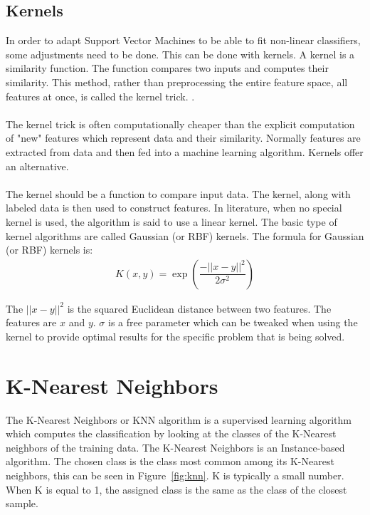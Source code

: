 \subsection{Kernels}
 In order to adapt Support Vector Machines to be able to fit non-linear classifiers, some adjustments need to be done. This can be done with kernels. A kernel is a similarity function. The function compares two inputs and computes their similarity. This method, rather than preprocessing the entire feature space, all features at once, is called the kernel trick. \cite{kernelTrick}. \\
\\
The kernel trick is often computationally cheaper than the explicit computation of "new" features which represent data and their similarity. Normally features are extracted from data and then fed into a machine learning algorithm. Kernels offer an alternative. \\
\\
The kernel should be a function to compare input data. The kernel, along with labeled data is then used to construct features. In literature, when no special kernel is used, the algorithm is said to use a linear kernel. The basic type of kernel algorithms are called Gaussian (or RBF) kernels. The formula for Gaussian (or RBF) kernels is: 
\begin{align}
K(x,y) = \exp{(\dfrac{-||x-y||^2}{2\sigma^2})}
\end{align}

\noindent The $||x-y||^2$ is the squared Euclidean distance between two features. The features are $x$ and $y$. $\sigma$ is a free parameter which can be tweaked when using the kernel to provide optimal results for the specific problem that is being solved. 

\section{K-Nearest Neighbors}
The K-Nearest Neighbors or KNN algorithm is a supervised learning algorithm which computes the classification by looking at the classes of the K-Nearest neighbors of the training data. The K-Nearest Neighbors is an Instance-based algorithm. \cite{mlcat} The chosen class is the class most common among its K-Nearest neighbors, this can be seen in Figure~\ref{fig:knn}. K is typically a small number. When K is equal to 1, the assigned class is the same as the class of the closest sample. 

